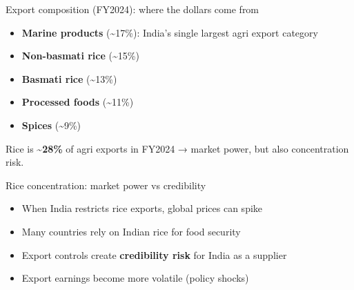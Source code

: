 \documentclass[
  ignorenonframetext,
  aspectratio=169,
]{beamer}
\makeatletter
\providecommand{\tightlist}{%
  \setlength{\itemsep}{0pt}\setlength{\parskip}{0pt}}
\let\quarto@originallabel\label
\DeclareRobustCommand*{\label}[1]{\quarto@originallabel{#1}}
\makeatother
\begin{document}
\begin{frame}
\begin{block}{Export composition (FY2024): where the dollars come from}
\label{export-composition-fy2024-where-the-dollars-come-from}
\begin{itemize}
\tightlist
\item
  \textbf{Marine products} (\textasciitilde17\%): India's single largest
  agri export category
\item
  \textbf{Non-basmati rice} (\textasciitilde15\%)
\item
  \textbf{Basmati rice} (\textasciitilde13\%)
\item
  \textbf{Processed foods} (\textasciitilde11\%)
\item
  \textbf{Spices} (\textasciitilde9\%)
\end{itemize}

Rice is \textasciitilde{}\textbf{28\%} of agri exports in FY2024 →
market power, but also concentration risk.
\end{block}
\end{frame}

\begin{frame}
\begin{block}{Rice concentration: market power vs credibility}
\label{rice-concentration-market-power-vs-credibility}
\begin{itemize}
\tightlist
\item
  When India restricts rice exports, global prices can spike
\item
  Many countries rely on Indian rice for food security
\item
  Export controls create \textbf{credibility risk} for India as a
  supplier
\item
  Export earnings become more volatile (policy shocks)
\end{itemize}
\end{block}
\end{frame}
\end{document}
